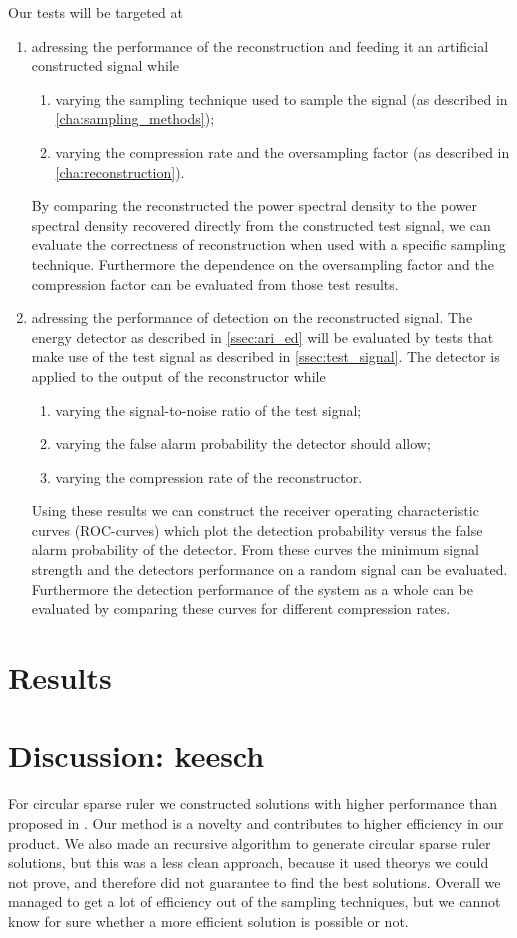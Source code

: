 \documentclass[a4paper, openany, oneside]{memoir}
\begin{document}
Our tests will be targeted at
\begin{enumerate}
	\item adressing the performance of the reconstruction and feeding it an artificial constructed signal while
	\begin{enumerate}
		\item varying the sampling technique used to sample the signal (as described in \cref{cha:sampling_methods});
		\item varying the compression rate and the oversampling factor (as described in \cref{cha:reconstruction}).
	\end{enumerate}
	By comparing the reconstructed the power spectral density to the power spectral density recovered directly from the constructed test signal, we can evaluate the correctness of reconstruction when used with a specific sampling technique.
	Furthermore the dependence on the oversampling factor and the compression factor can be evaluated from those test results. 
	\item adressing the performance of detection on the reconstructed signal. The energy detector as described in \cref{ssec:ari_ed} will be evaluated by tests that make use of the test signal as described in \cref{ssec:test_signal}. 
	The detector is applied to the output of the reconstructor while	
	\begin{enumerate}
		\item varying the signal-to-noise ratio of the test signal; 
		\item varying the false alarm probability the detector 
		should allow;
		\item varying the compression rate of the reconstructor.
	\end{enumerate}
	Using these results we can construct the receiver operating characteristic curves (ROC-curves) which plot the detection probability versus the false alarm probability of the detector. From these curves the minimum signal strength and the detectors performance on a random signal can be evaluated. Furthermore the detection performance of the system as a whole can be evaluated by comparing these curves for different compression rates.
	\end{enumerate}

\section{Results}



\section{Discussion: keesch}
For circular sparse ruler we constructed solutions with higher performance than proposed in \cite{ariananda2012compressive}. Our method is a novelty and contributes to higher efficiency in our product. We also made an recursive algorithm to generate circular sparse ruler solutions,  but this was a less clean approach, because it used  theorys we could not prove, and therefore did not guarantee to find the best solutions. Overall we managed to get a lot of efficiency out of the sampling techniques, but we cannot know for sure whether a more efficient solution is possible or not.
\end{document}
